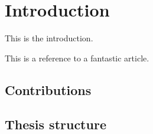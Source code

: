 \chapter{Introduction}

This is the introduction. 

This is a reference to a fantastic \cite{boltuzic2017toward} article.

\section{Contributions}


\section{Thesis structure}

